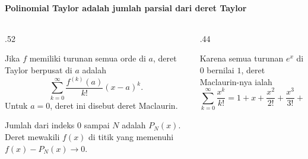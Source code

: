 \documentclass{../../kalkulus-ppt}
\begin{document}
\begin{frame}{\insertsection}
    \framesubtitle{Polinomial Taylor adalah jumlah parsial dari deret Taylor}
    \begin{columns}[c,onlytextwidth]
        \begin{column}{.52\textwidth}
            \begin{definisi}
                Jika $f$ memiliki turunan semua orde di $a$,
                deret Taylor berpusat di $a$ adalah
                \[
                    \sum_{k=0}^\infty\frac{f^{(k)}(a)}{k!}(x-a)^k.
                \]
                Untuk $a=0$, deret ini disebut deret Maclaurin.
            \end{definisi}
            Jumlah dari indeks $0$ sampai $N$ adalah $P_N(x)$.
            Deret mewakili $f(x)$ di titik yang memenuhi
            $f(x)-P_N(x)\to0$.
        \end{column}
        \begin{column}{.44\textwidth}
            \begin{contoh}
                Karena semua turunan $e^x$ di $0$ bernilai $1$,
                deret Maclaurin-nya ialah
                \[
                    \sum_{k=0}^\infty \frac{x^k}{k!}
                    =1+x+\frac{x^2}{2!}+\frac{x^3}{3!}+\cdots.
                \]
            \end{contoh}
        \end{column}
    \end{columns}
\end{frame}
\end{document}
